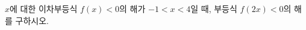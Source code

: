 \hspace*{2mm}\begin{minipage}[t]{\dimexpr\linewidth-2mm\relax}\vspace{0pt}
$x$에 대한 이차부등식 $f(x)<0$의 해가 $-1<x<4$일 때, 부등식 $f(2x)<0$의 해를 구하시오.\end{minipage}
